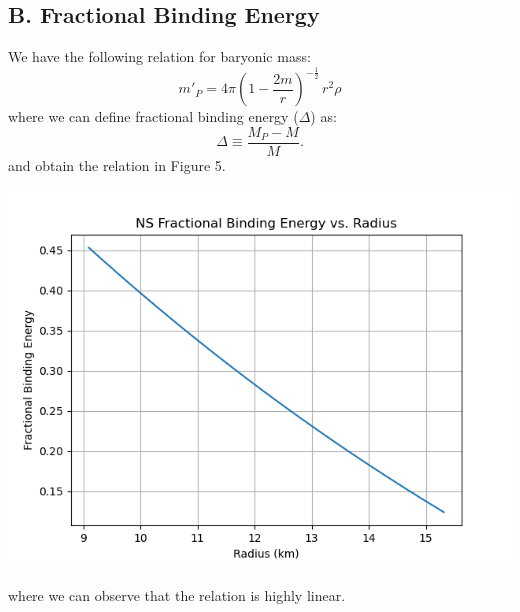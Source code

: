 \documentclass{article}
\begin{document}
\subsection*{B. Fractional Binding Energy}
We have the following relation for baryonic mass:
\begin{equation}
    m'_P = 4\pi \left(1 - \frac{2m}{r}\right)^{-\frac{1}{2}} \, r^2 \rho
\end{equation}
where we can define fractional binding energy ($\Delta$) as:
\begin{equation}
    \Delta \equiv \frac{M_P - M}{M}.
\end{equation}
and obtain the relation in Figure 5.
\begin{center}
    \includegraphics[scale=0.65]{images_einstein/e2_frac_binding_energy.png}
\end{center}
where we can observe that the relation is highly linear.
\end{document}
